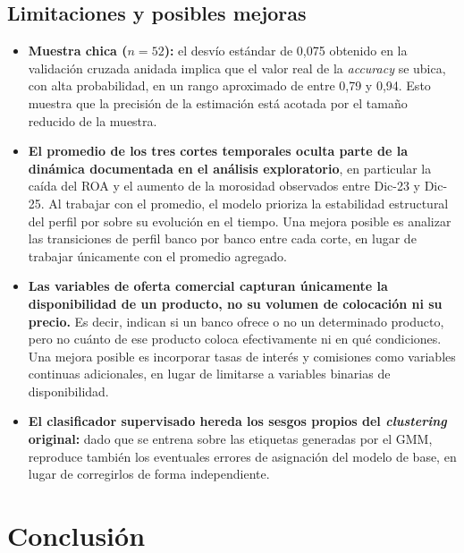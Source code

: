 \documentclass[11pt,a4paper]{article}
\begin{document}
\subsection{Limitaciones y posibles mejoras}
\begin{itemize}
  \item \textbf{Muestra chica ($n = 52$):} el desvío estándar de 0,075 obtenido en la validación cruzada
  anidada implica que el valor real de la \textit{accuracy} se ubica, con alta probabilidad, en un rango
  aproximado de entre 0,79 y 0,94. Esto muestra que la precisión de la estimación está acotada por el
  tamaño reducido de la muestra.
  \item \textbf{El promedio de los tres cortes temporales oculta parte de la dinámica documentada en el
  análisis exploratorio}, en particular la caída del ROA y el aumento de la morosidad observados entre
  Dic-23 y Dic-25. Al trabajar con el promedio, el modelo prioriza la estabilidad estructural del perfil
  por sobre su evolución en el tiempo. Una mejora posible es analizar las transiciones de perfil banco
  por banco entre cada corte, en lugar de trabajar únicamente con el promedio agregado.
  \item \textbf{Las variables de oferta comercial capturan únicamente la disponibilidad de un producto,
  no su volumen de colocación ni su precio.} Es decir, indican si un banco ofrece o no un determinado
  producto, pero no cuánto de ese producto coloca efectivamente ni en qué condiciones. Una mejora
  posible es incorporar tasas de interés y comisiones como variables continuas adicionales, en lugar de
  limitarse a variables binarias de disponibilidad.
  \item \textbf{El clasificador supervisado hereda los sesgos propios del \textit{clustering} original:}
  dado que se entrena sobre las etiquetas generadas por el GMM, reproduce también los eventuales errores
  de asignación del modelo de base, en lugar de corregirlos de forma independiente.
\end{itemize}

\section{Conclusión}
\label{sec:conclusion}
\end{document}
